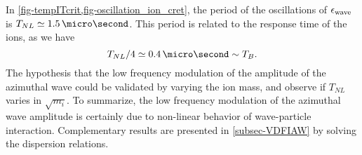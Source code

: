     In \cref{fig-tempITcrit,fig-oscillation_ion_cret}, the period of the oscillations of $\epsilon_{\rm wave}$ is $T_{NL} \simeq 1.5\,\micro\second$.
    This period is related to the response time of the ions, as we have $$T_{NL}/4 \simeq 0.4\,\micro\second \sim T_B.$$
    The hypothesis that the low frequency modulation of the amplitude of the azimuthal wave could be validated by varying the ion mass, and observe if $T_{NL}$ varies in $\sqrt{m_i}$.    
    To summarize, the low frequency modulation of the azimuthal wave amplitude is certainly due to non-linear behavior of wave-particle interaction.
    Complementary results are presented in \cref{subsec-VDFIAW} by solving the dispersion relations.
    
